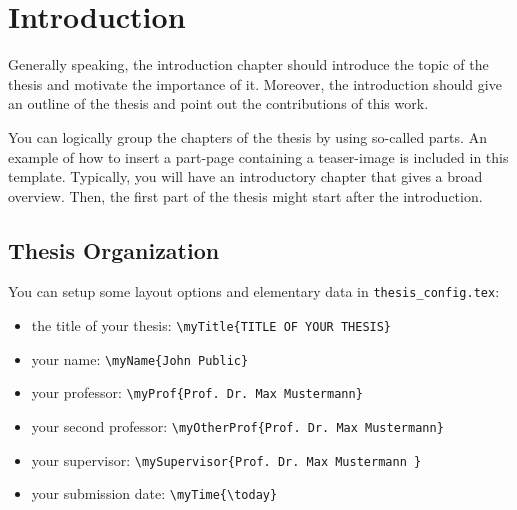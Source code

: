 \chapter{Introduction}
\label{chapter:Introduction}

Generally speaking, the introduction chapter should introduce the 
topic of the thesis and motivate the importance of it. Moreover, the
introduction should give an outline of the thesis and point out the 
contributions of this work.

You can logically group the chapters of the thesis
by using so-called parts. An example of how to insert a part-page 
containing a teaser-image is included in this template.
Typically, you will have an introductory chapter that gives a
broad overview. Then, the first part of the thesis might start after 
the introduction.

\section{Thesis Organization}
\label{section:thesisOrganization}
You can setup some layout options and elementary data in \texttt{thesis\_config.tex}:
\begin{itemize}
	\item the title of your thesis: \texttt{\textbackslash myTitle\{TITLE OF YOUR THESIS\}}
	\item your name: \texttt{\textbackslash myName\{John Public\}}
	\item your professor: \texttt{\textbackslash myProf\{Prof.\ Dr.\ Max Mustermann\}}
	\item your second professor: \texttt{\textbackslash myOtherProf\{Prof.\ Dr.\ Max Mustermann\}}
	\item your supervisor: \texttt{\textbackslash mySupervisor\{Prof.\ Dr.\ Max Mustermann \}}	
	\item your submission date: \texttt{\textbackslash myTime\{\textbackslash today\}}		
\end{itemize}